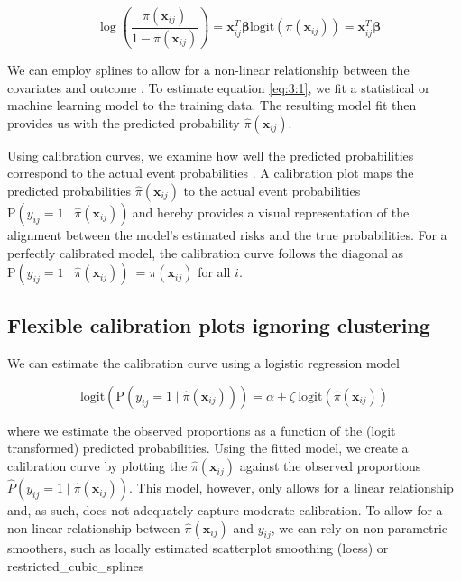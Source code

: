 \[{{\ \ \ \log}\left( \frac{\pi\left( \mathbf{x}_{ij} \right)}{1 - \pi\left( \mathbf{x}_{ij} \right)} \right) = \mathbf{x}_{ij}^{T}\mathbf{\beta}}{\text{logit}\left( \pi\left( \mathbf{x}_{ij} \right) \right)\mathbf{=}\mathbf{x}_{ij}^{T}\mathbf{\beta}}\]

We can employ splines to allow for a non-linear relationship between the covariates and outcome \cite{harrellRegressionModelingStrategies2015}. To estimate equation \ref{eq:3:1}, we fit a statistical or machine learning model to the training data. The resulting model fit then provides us with the predicted probability \(\widehat{\pi}\left( \mathbf{x}_{ij} \right)\).

Using calibration curves, we examine how well the predicted probabilities correspond to the actual event probabilities \cite{steyerbergClinicalPredictionModels2009,vancalsterCalibrationHierarchyRisk2016,dimitriadisHonestCalibrationAssessment2023,decockcampoReliablePredictiveAnalytics2023}. A calibration plot maps the predicted probabilities \(\widehat{\pi}\left( \mathbf{x}_{ij} \right)\) to the actual event probabilities \(\text{P}\left( y_{ij} = 1\mid\widehat{\pi}\left( \mathbf{x}_{ij} \right) \right)\ \)and hereby provides a visual representation of the alignment between the model's estimated risks and the true probabilities. For a perfectly calibrated model, the calibration curve follows the diagonal as \(\text{P}\left( y_{ij} = 1\mid\widehat{\pi}\left( \mathbf{x}_{ij} \right) \right)\  = \pi\left( \mathbf{x}_{ij} \right)\) for all \(i\).

\subsection{Flexible calibration plots ignoring clustering}
We can estimate the calibration curve using a logistic regression model \cite{decockcampoReliablePredictiveAnalytics2023,onbehalfoftopicgroupevaluatingdiagnostictestsandpredictionmodelsofthestratosinitiativeCalibrationAchillesHeel2019,coxTwoFurtherApplications1958}

\[\text{logit}\left( \text{P}\left( y_{ij} = 1\mid\widehat{\pi}\left( \mathbf{x}_{ij} \right) \right) \right)\mathbf{=}\alpha + \zeta\ \text{logit}\left( \widehat{\pi}\left( \mathbf{x}_{ij} \right) \right)\]

where we estimate the observed proportions as a function of the (logit transformed) predicted probabilities. Using the fitted model, we create a calibration curve by plotting the \(\widehat{\pi}\left( \mathbf{x}_{ij} \right)\) against the observed proportions \(\widehat{P}\left( y_{ij} = 1\mid\widehat{\pi}\left( \mathbf{x}_{ij} \right) \right)\). This model, however, only allows for a linear relationship and, as such, does not adequately capture moderate calibration. To allow for a non-linear relationship between \(\widehat{\pi}\left( \mathbf{x}_{ij} \right)\) and \(y_{ij}\), we can rely on non-parametric smoothers, such as locally estimated scatterplot smoothing (loess) or \gls{restricted_cubic_splines}

